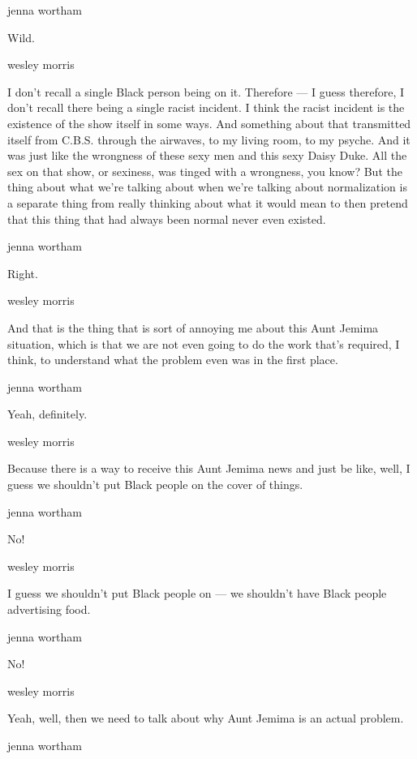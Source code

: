 jenna wortham

Wild.

wesley morris

I don't recall a single Black person being on it. Therefore --- I guess
therefore, I don't recall there being a single racist incident. I think
the racist incident is the existence of the show itself in some ways.
And something about that transmitted itself from C.B.S. through the
airwaves, to my living room, to my psyche. And it was just like the
wrongness of these sexy men and this sexy Daisy Duke. All the sex on
that show, or sexiness, was tinged with a wrongness, you know? But the
thing about what we're talking about when we're talking about
normalization is a separate thing from really thinking about what it
would mean to then pretend that this thing that had always been normal
never even existed.

jenna wortham

Right.

wesley morris

And that is the thing that is sort of annoying me about this Aunt Jemima
situation, which is that we are not even going to do the work that's
required, I think, to understand what the problem even was in the first
place.

jenna wortham

Yeah, definitely.

wesley morris

Because there is a way to receive this Aunt Jemima news and just be
like, well, I guess we shouldn't put Black people on the cover of
things.

jenna wortham

No!

wesley morris

I guess we shouldn't put Black people on --- we shouldn't have Black
people advertising food.

jenna wortham

No!

wesley morris

Yeah, well, then we need to talk about why Aunt Jemima is an actual
problem.

jenna wortham

